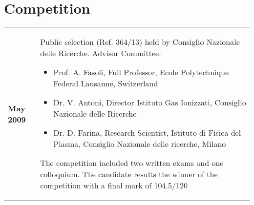 \section{Competition}
\begin{tabular}{>{\bfseries}l p{15cm}}
May 2009 & Public selection (Ref. 364/13) held by Consiglio
  Nazionale delle Ricerche. Advisor Committee:
  \begin{itemize}
  \item Prof. A. Fasoli, Full Professor, Ecole Polytechnique Federal Lausanne, Switzerland
  \item Dr. V. Antoni, Director Istituto Gas Ionizzati, Consiglio Nazionale delle Ricerche
  \item Dr. D. Farina, Research Scientist, Istituto di Fisica del
    Plasma, Consiglio Nazionale delle ricerche, Milano
  \end{itemize}
  The competition included two written exams
  and one colloquium. The candidate results the winner of the
  competition with a final mark of 104.5/120 
\end{tabular}
